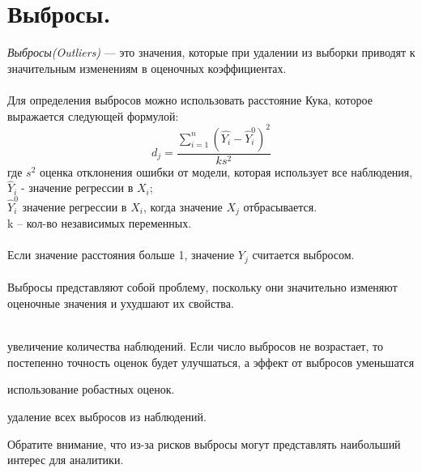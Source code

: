\documentclass{article}
\begin{document}
	\section{Выбросы.}
	\textit{Выбросы(Outliers)} — это значения, которые при удалении из выборки приводят к значительным изменениям в оценочных коэффициентах.
	\\
	\\
	Для определения выбросов можно использовать расстояние Кука, которое выражается следующей формулой:
	\begin{equation}
		d_j=\frac{\sum_{i=1}^n\left(\widehat{Y_i}-\widehat{Y}_i^0\right)^2}{k s^2}
	\end{equation}
	где $s^2$ оценка отклонения ошибки от модели, которая использует все наблюдения,\\
	$\widehat{Y}_i$ - значение регрессии в $X_i$;\\
	$\widehat{Y}_i^{0}$ значение регрессии в $X_i$, когда значение $X_j$ отбрасывается.\\
	k – кол-во независимых переменных.
	\\
	\\
	Если значение расстояния больше 1, значение $Y_j$ считается выбросом.
	\\
	\\
	Выбросы представляют собой проблему, поскольку они значительно изменяют оценочные значения и ухудшают их свойства.
	\\
	\\
	\begin{list}{--}{Способы устранения проблемы выбросов:}
		\item увеличение количества наблюдений. Если число выбросов не возрастает, то постепенно точность оценок будет улучшаться, а эффект от выбросов уменьшатся
		\item использование робастных оценок. 
		\item удаление всех выбросов из наблюдений. 
	\end{list}
	Обратите внимание, что из-за рисков выбросы могут представлять наибольший интерес для аналитики.
	
	
	
\end{document}
